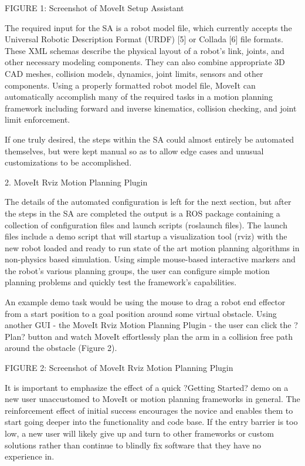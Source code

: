 \documentclass[10pt,journal,compsoc]{joser1}
\begin{document}
{FIGURE 1: Screenshot of MoveIt Setup Assistant

The required input for the SA is a robot model file, which currently accepts the Universal Robotic Description Format (URDF) [5] or Collada [6] file formats. These XML schemas describe the physical layout of a robot's link, joints, and other necessary modeling components. They can also combine appropriate 3D CAD meshes, collision models, dynamics, joint limits, sensors and other components. Using a properly formatted robot model file, MoveIt can automatically accomplish many of the required tasks in a motion planning framework including forward and inverse kinematics, collision checking, and joint limit enforcement.

If one truly desired, the steps within the SA could almost entirely be automated themselves, but were kept manual so as to allow edge cases and unusual customizations to be accomplished.

2. MoveIt Rviz Motion Planning Plugin

The details of the automated configuration is left for the next section, but after the steps in the SA are completed the output is a ROS package containing a collection of configuration files and launch scripts (roslaunch files). The launch files include a demo script that will startup a visualization tool (rviz) with the new robot loaded and ready to run state of the art motion planning algorithms in non-physics based simulation. Using simple mouse-based interactive markers and the robot's various planning groups, the user can configure simple motion planning problems and quickly test the framework's capabilities.  

An example demo task would be using the mouse to drag a robot end effector from a start position to a goal position around some virtual obstacle. Using another GUI - the MoveIt Rviz Motion Planning Plugin - the user can click the ?Plan? button and watch MoveIt effortlessly plan the arm in a collision free path around the obstacle (Figure 2).

FIGURE 2: Screenshot of MoveIt Rviz Motion Planning Plugin

It is important to emphasize the effect of a quick ?Getting Started? demo on a new user unaccustomed to MoveIt or motion planning frameworks in general. The reinforcement effect of initial success encourages the novice and enables them to start going deeper into the functionality and code base. If the entry barrier is too low, a new user will likely give up and turn to other frameworks or custom solutions rather than continue to blindly fix software that they have no experience in.

}
\end{document}
